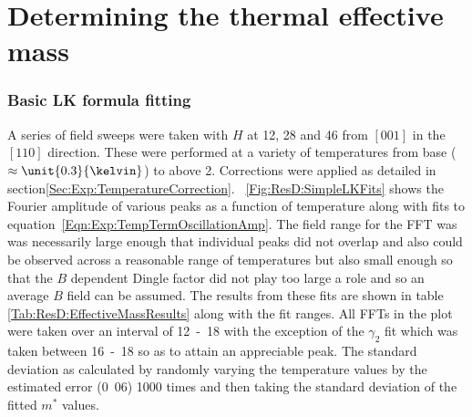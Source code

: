 
\section{Determining the thermal effective mass}


\subsubsection{Basic \ac{LK} formula fitting}

A series of field sweeps were taken with $H$ at \unit{12}{\degree}, \unit{28}{\degree} and \unit{46}{\degree} from $[001]$ in the $[110]$ direction. These were performed at a variety of temperatures from base ($\approx\unit{0.3}{\kelvin}$) to above \unit{2}{\kelvin}. Corrections were applied as detailed in section\ref{Sec:Exp:TemperatureCorrection}. \Fig~\ref{Fig:ResD:SimpleLKFits} shows the Fourier amplitude of various peaks as a function of temperature along with fits to equation~\ref{Eqn:Exp:TempTermOscillationAmp}. The field range for the \ac{FFT} was was necessarily large enough that individual peaks did not overlap and also could be observed across a reasonable range of temperatures but also small enough so that the $B$ dependent Dingle factor did not play too large a role and so an average $B$ field can be assumed. The results from these fits are shown in table \ref{Tab:ResD:EffectiveMassResults} along with the fit ranges. All \acp{FFT} in the plot were taken over an interval of \unit{12-18}{\tesla} with the exception of the $\gamma_2$ fit which was taken between \unit{16-18}{\tesla} so as to attain an appreciable peak. The standard deviation as calculated by randomly varying the temperature values by the estimated error (\unit{0.06}{\tesla}) 1000 times and then taking the standard deviation of the fitted $m^*$ values.
